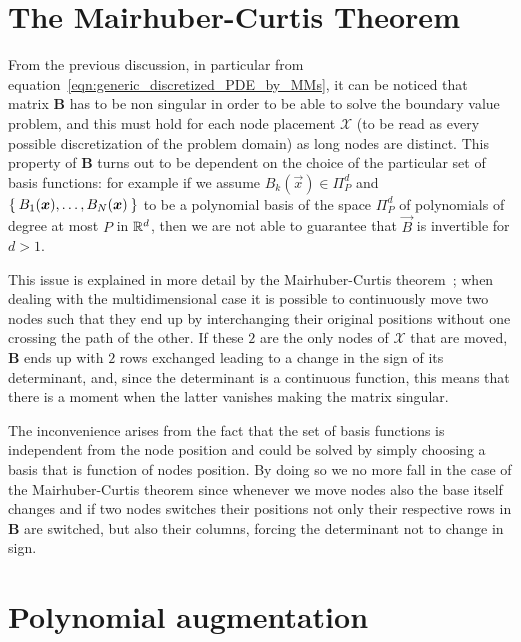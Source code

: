 \section{The Mairhuber-Curtis Theorem}

From the previous discussion, in particular from equation~\eqref{eqn:generic_discretized_PDE_by_MMs}, it can be noticed that matrix $\boldsymbol{B}$ has to be non singular in order to be able to solve the boundary value problem, and this must hold for each node placement $\mathcal{X}$ (to be read as every possible discretization of the problem domain) as long nodes are distinct. This property of $\boldsymbol{B}$ turns out to be dependent on the choice of the particular set of basis functions: for example if we assume $B_k(\vec{x})\in\Pi_P^d$ and $\Set{B_1(\boldsymbol{x}), \dots, B_N(\boldsymbol{x})}$ to be a polynomial basis of the space $\Pi_P^d$ of polynomials of degree at most $P$ in $\mathbb{R}^d$, then we are not able to guarantee that $\vec{B}$ is invertible for $d>1$.

This issue is explained in more detail by the Mairhuber-Curtis theorem~\cite{Mairhuber:interpolation_basis_problem}; when dealing with the multidimensional case it is possible to continuously move two nodes such that they end up by interchanging their original positions without one crossing the path of the other. If these $2$ are the only nodes of $\mathcal{X}$ that are moved, $\boldsymbol{B}$ ends up with $2$ rows exchanged leading to a change in the sign of its determinant, and, since the determinant is a continuous function, this means that there is a moment when the latter vanishes making the matrix singular.

The inconvenience arises from the fact that the set of basis functions is independent from the node position and could be solved by simply choosing a basis that is function of nodes position. By doing so we no more fall in the case of the Mairhuber-Curtis theorem since whenever we move nodes also the base itself changes and if two nodes switches their positions not only their respective rows in $\boldsymbol{B}$ are switched, but also their columns, forcing the determinant not to change in sign.


\section{Polynomial augmentation}

